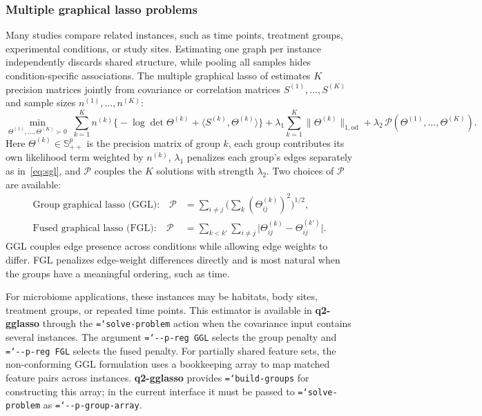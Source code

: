 \documentclass[11pt,a4paper]{article}
\newcommand{\code}[1]{\allowbreak\texttt{\hyphenchar\font=`\-\relax #1}}
\newcommand{\pkg}[1]{\textbf{#1}}
\newcommand{\Sp}{\mathbb{S}}
\newcommand{\Th}{\Theta}
\newcommand{\odnorm}[1]{\lVert #1 \rVert_{1,\mathrm{od}}}
\begin{document}
\subsubsection{Multiple graphical lasso problems}
\label{sec:mgl}

Many studies compare related instances, such as time points, treatment groups,
experimental conditions, or study sites. Estimating one graph per instance
independently discards shared structure, while pooling all samples hides
condition-specific associations. The multiple graphical lasso of
\citet{danaher2014joint} estimates $K$ precision matrices jointly from
covariance or correlation matrices $S^{(1)},\ldots,S^{(K)}$ and sample sizes
$n^{(1)},\ldots,n^{(K)}$:
\begin{equation}
\label{eq:mgl}
\min_{\Th^{(1)},\dots,\Th^{(K)} \succ 0} \;
\sum_{k=1}^{K} n^{(k)}
\Big\{ -\log\det \Th^{(k)} + \langle S^{(k)}, \Th^{(k)} \rangle \Big\}
+ \lambda_{1} \sum_{k=1}^{K} \odnorm{\Th^{(k)}}
+ \lambda_{2}\, \mathcal{P}\!\left(\Th^{(1)},\dots,\Th^{(K)}\right).
\end{equation}
Here $\Th^{(k)} \in \Sp^{p}_{++}$ is the precision matrix of group $k$, each
group contributes its own likelihood term weighted by $n^{(k)}$, $\lambda_1$
penalizes each group's edges separately as in~\eqref{eq:sgl}, and
$\mathcal{P}$ couples the $K$ solutions with strength $\lambda_2$. Two choices of
$\mathcal{P}$ are available:
\begin{align}
\text{Group graphical lasso (GGL):}\quad
\mathcal{P} &= \sum_{i \neq j} \Big( \textstyle\sum_{k} (\Th^{(k)}_{ij})^{2} \Big)^{1/2},
\label{eq:ggl}\\
\text{Fused graphical lasso (FGL):}\quad
\mathcal{P} &= \sum_{k < k'} \sum_{i \neq j} \big| \Th^{(k)}_{ij} - \Th^{(k')}_{ij} \big| .
\label{eq:fgl}
\end{align}
GGL couples edge presence across conditions while allowing edge weights to
differ. FGL penalizes edge-weight differences directly and is most natural when
the groups have a meaningful ordering, such as time.

For microbiome applications, these instances may be habitats, body sites,
treatment groups, or repeated time points. This estimator is available in
\pkg{q2-gglasso} through the \code{solve-problem} action when the covariance
input contains several instances. The argument \code{-{}-p-reg GGL} selects the
group penalty and \code{-{}-p-reg FGL} selects the fused penalty. For partially
shared feature sets, the non-conforming GGL formulation uses a bookkeeping array
to map matched feature pairs across instances. \pkg{q2-gglasso} provides
\code{build-groups} for constructing this array; in the current interface it
must be passed to \code{solve-problem} as \code{-{}-p-group-array}.
\end{document}
